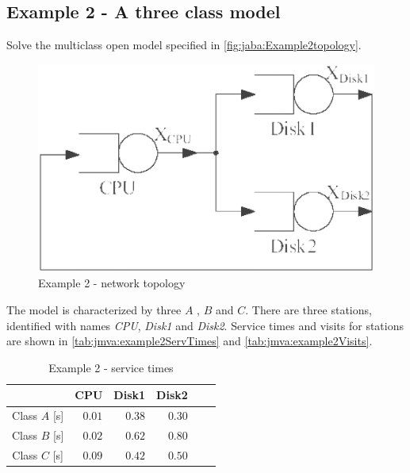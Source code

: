 \subsection{Example 2 - A three class model}
\label{sec:jaba:example2} Solve the multiclass open model specified
in \autoref{fig:jaba:Example2topology}.
\begin{figure}[htbp]
    \begin{center}
        \includegraphics[scale=.35]{img/jaba/example2}
    \end{center}
    \caption{Example 2 - network topology}
    \label{fig:jaba:Example2topology}
\end{figure}
The model is characterized by three $A$ , $B$ and $C$.
There are three
stations, identified with names \emph{CPU},
\emph{Disk1} and \emph{Disk2}. Service times and visits for stations
are shown in \autoref{tab:jmva:example2ServTimes} and \autoref{tab:jmva:example2Visits}.

\begin{table}[htbp]
\begin{center}
\begin{tabular}{c|r|r|r|r|r|}
& \multicolumn{1}{c|}{CPU} & \multicolumn{1}{c|}{Disk1} & \multicolumn{1}{c|}{Disk2} \\
\hline
Class $A$ [s]& $0.01$ & $0.38$ & $0.30$ \\
Class $B$ [s]& $0.02$ & $0.62$ & $0.80$ \\
Class $C$ [s]& $0.09$ & $0.42$ & $0.50$ \\
\hline
\end{tabular}
\end{center}
\caption{Example 2 - service times}
\label{tab:jmva:example2ServTimes}
\end{table}


